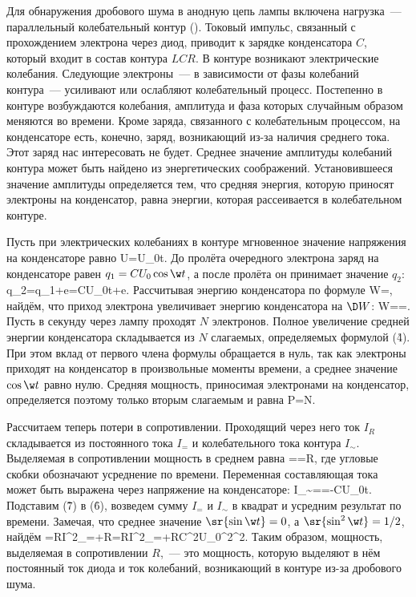 Для обнаружения дробового шума в анодную цепь лампы включена нагрузка~--- параллельный колебательный контур ().
Токовый импульс, связанный с прохождением электрона через диод, приводит к зарядке конденсатора $C$, который входит в
состав контура $LCR$. В контуре возникают электрические колебания. Следующие электроны~--- в зависимости от фазы
колебаний контура~--- усиливают или ослабляют колебательный процесс. Постепенно в контуре возбуждаются колебания,
амплитуда и фаза которых случайным образом меняются во времени. Кроме заряда, связанного с колебательным процессом, на
конденсаторе есть, конечно, заряд, возникающий из-за наличия среднего тока. Этот заряд нас интересовать не будет.
Среднее значение амплитуды колебаний контура может быть найдено из энергетических соображений. Установившееся значение
амплитуды определяется тем, что средняя энергия, которую приносят электроны на конденсатор, равна энергии, которая
рассеивается в колебательном контуре.

Пусть при электрических колебаниях в контуре мгновенное значение напряжения на конденсаторе равно
U=U_0\cos\w t.
\ee
До пролёта очередного электрона заряд на конденсаторе равен $q_1=CU_0\cos\w t$, а после пролёта он принимает значение
$q_2$:
q_2=q_1+e=CU_0\cos\w t+e.
\ee
Рассчитывая энергию конденсатора по формуле
W=,
\ee
найдём, что приход электрона увеличивает энергию конденсатора на $\D W$:
\D W==.
\ee
Пусть в секунду через лампу проходят $N$ электронов. Полное увеличение средней энергии конденсатора складывается из $N$
слагаемых, определяемых формулой (\r{4}). При этом вклад от первого члена формулы обращается в нуль, так как электроны
приходят на конденсатор в произвольные моменты времени, а среднее значение $\cos\w t$ равно нулю. Средняя мощность,
приносимая электронами на конденсатор, определяется поэтому только вторым слагаемым и равна
P=N.
\ee

Рассчитаем теперь потери в сопротивлении. Проходящий через него ток $I_R$ складывается из постоянного тока $I_=$ и
колебательного тока контура $I_{\sim}$. Выделяемая в сопротивлении мощность в среднем равна
==R,
\ee
где угловые скобки обозначают усреднение по времени. Переменная составляющая тока может быть выражена через напряжение
на конденсаторе:
I_{\sim}==-CU_0\w\sin\w t.
\ee
Подставим (\r{7}) в (\r{6}), возведем сумму $I_{=}$ и $I_{\sim}$ в квадрат и усредним результат по времени. Замечая, что
среднее значение $\sr{\sin\w t}=0$, а $\sr{\sin^2\w t}=1/2$, найдём
=RI^2_{=}+R=RI^2_{=}+RC^2U_0^2\w^2.
\ee
Таким образом, мощность, выделяемая в сопротивлении $R$,~--- это мощность, которую выделяют в нём постоянный ток диода и
ток колебаний, возникающий в контуре из-за дробового шума.

